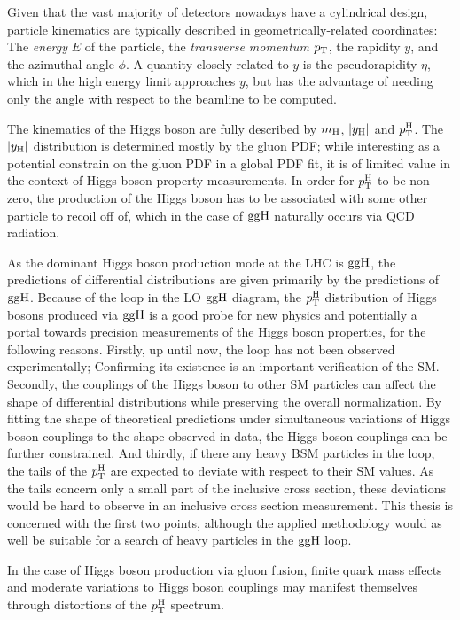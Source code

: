 Given that the vast majority of detectors nowadays have a cylindrical design, particle kinematics are typically described in geometrically-related coordinates: The \textit{energy} $E$ of the particle, the \textit{transverse momentum} $p_\mathrm{T}$, the rapidity $y$, and the azimuthal angle $\phi$.
% 
A quantity closely related to $y$ is the pseudorapidity $\eta$, which in the high energy limit approaches $y$, but has the advantage of needing only the angle with respect to the beamline to be computed.



The kinematics of the Higgs boson are fully described by $m_{\mathrm{H}}$, $\left|y_\mathrm{H}\right| $ and $p_\mathrm{T}^\mathrm{H}$.
% 
The $\left|y_\mathrm{H}\right| $ distribution is determined mostly by the gluon PDF; while interesting as a potential constrain on the gluon PDF in a global PDF fit, it is of limited value in the context of Higgs boson property measurements.
% 
In order for $p_\mathrm{T}^\mathrm{H}$ to be non-zero, the production of the Higgs boson has to be associated with some other particle to recoil off of, which in the case of $\mathrm{g}\mathrm{g}\mathrm{H}$ naturally occurs via QCD radiation.





As the dominant Higgs boson production mode at the LHC is $\mathrm{g}\mathrm{g}\mathrm{H}$, the predictions of differential distributions are given primarily by the predictions of $\mathrm{g}\mathrm{g}\mathrm{H}$.
% 
Because of the loop in the LO $\mathrm{g}\mathrm{g}\mathrm{H}$ diagram, the $p_\mathrm{T}^\mathrm{H}$ distribution of Higgs bosons produced via $\mathrm{g}\mathrm{g}\mathrm{H}$ is a good probe for new physics and potentially a portal towards precision measurements of the Higgs boson properties, for the following reasons.
% 
Firstly, up until now, the loop has not been observed experimentally; Confirming its existence is an important verification of the SM.
% 
Secondly, the couplings of the Higgs boson to other SM particles can affect the shape of differential distributions while preserving the overall normalization.
% 
By fitting the shape of theoretical predictions under simultaneous variations of Higgs boson couplings to the shape observed in data, the Higgs boson couplings can be further constrained.
% 
And thirdly, if there any heavy BSM particles in the loop, the tails of the $p_\mathrm{T}^\mathrm{H}$ are expected to deviate with respect to their SM values.
% 
As the tails concern only a small part of the inclusive cross section, these deviations would be hard to observe in an inclusive cross section measurement.
% 
This thesis is concerned with the first two points, although the applied methodology would as well be suitable for a search of heavy particles in the $\mathrm{g}\mathrm{g}\mathrm{H}$ loop.







% 
In the case of Higgs boson production via gluon fusion, finite quark mass effects and moderate variations to Higgs boson couplings may manifest themselves through distortions of the $p_\mathrm{T}^\mathrm{H}$ spectrum.

